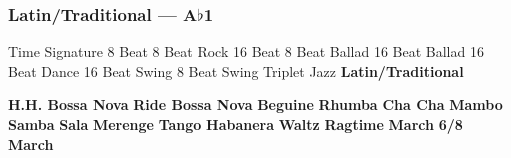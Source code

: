 \subsubsection[Latin/Traditional]{Latin/Traditional --- \UiKey{\II}\UiKey{\MET}A$\flat$1}
Time Signature
8 Beat
8 Beat Rock
16 Beat
8 Beat Ballad
16 Beat Ballad
16 Beat Dance
16 Beat Swing
8 Beat Swing
Triplet
Jazz
\textbf{Latin/Traditional}





























\textbf{H.H. Bossa Nova}
\textbf{Ride Bossa Nova}
\textbf{Beguine}
\textbf{Rhumba}
\textbf{Cha Cha}
\textbf{Mambo}
\textbf{Samba}
\textbf{Sala}
\textbf{Merenge}
\textbf{Tango}
\textbf{Habanera}
\textbf{Waltz}
\textbf{Ragtime}
\textbf{March}
\textbf{6/8 March}
